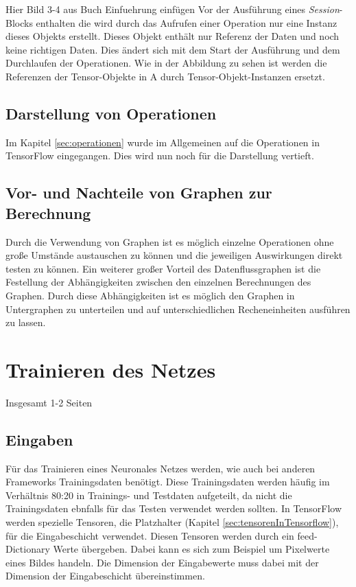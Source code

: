 Hier Bild 3-4 aus Buch Einfuehrung einfügen
Vor der Ausführung eines \textit{Session}-Blocks enthalten die wird durch das Aufrufen einer Operation nur eine Instanz dieses Objekts erstellt. Dieses Objekt enthält nur Referenz der Daten und noch keine richtigen Daten. Dies ändert sich mit dem Start der Ausführung und dem Durchlaufen der Operationen. Wie in der Abbildung zu sehen ist werden die Referenzen der Tensor-Objekte in A durch Tensor-Objekt-Instanzen ersetzt.

\subsection{Darstellung von Operationen}
\label{sec:darstellungOperationen}
Im Kapitel \ref{sec:operationen} wurde im Allgemeinen auf die Operationen in TensorFlow eingegangen. Dies wird nun noch für die Darstellung vertieft. 

\subsection{Vor- und Nachteile von Graphen zur Berechnung}
\label{sec:vorUndNachteile}
Durch die Verwendung von Graphen ist es möglich einzelne Operationen ohne große Umstände austauschen zu können und die jeweiligen Auswirkungen direkt testen zu können. Ein weiterer großer Vorteil des Datenflussgraphen ist die Festellung der Abhängigkeiten zwischen den einzelnen Berechnungen des Graphen. Durch diese Abhängigkeiten ist es möglich den Graphen in Untergraphen zu unterteilen und auf unterschiedlichen Recheneinheiten ausführen zu lassen. 


\section{Trainieren des Netzes}
\label{sec:trainierenDesNetzes}
\printsubchapterauthor{\authorNiklas}
Insgesamt 1-2 Seiten
\subsection{Eingaben}
\label{sec:eingaben}
Für das Trainieren eines Neuronales Netzes werden, wie auch bei anderen Frameworks Trainingsdaten benötigt. Diese Trainingsdaten werden häufig im Verhältnis 80:20 in Trainings- und Testdaten aufgeteilt, da nicht die Trainingsdaten ebnfalls für das Testen verwendet werden sollten. In TensorFlow werden spezielle Tensoren, die Platzhalter (Kapitel \ref{sec:tensorenInTensorflow}), für die Eingabeschicht verwendet. Diesen Tensoren werden durch ein feed-Dictionary Werte übergeben. Dabei kann es sich zum Beispiel um Pixelwerte eines Bildes handeln. Die Dimension der Eingabewerte muss dabei mit der Dimension der Eingabeschicht übereinstimmen. 

